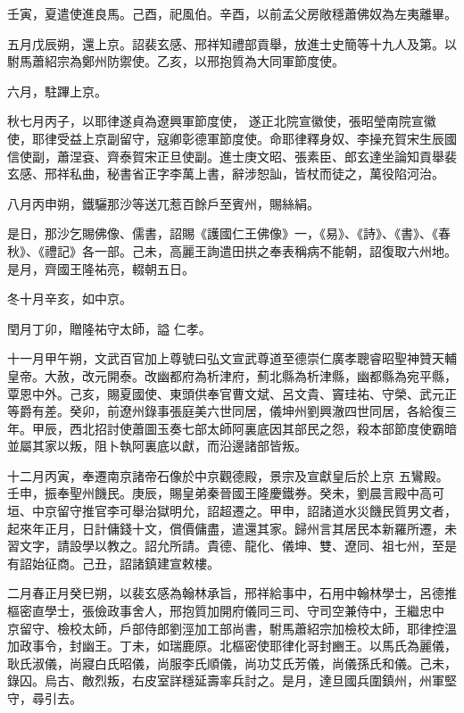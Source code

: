 \begin{pinyinscope}
 壬寅，夏遣使進良馬。己酉，祀風伯。辛酉，以前孟父房敞穩蕭佛奴為左夷離畢。



 五月戊辰朔，還上京。詔裴玄感、邢祥知禮部貢舉，放進士史簡等十九人及第。以駙馬蕭紹宗為鄭州防禦使。乙亥，以邢抱質為大同軍節度使。



 六月，駐蹕上京。



 秋七月丙子，以耶律遂貞為遼興軍節度使，
 遂正北院宣徽使，張昭瑩南院宣徽使，耶律受益上京副留守，寇卿彰德軍節度使。命耶律釋身奴、李操充賀宋生辰國信使副，蕭涅袞、齊泰賀宋正旦使副。進士庚文昭、張素臣、郎玄達坐論知貢舉裴玄感、邢祥私曲，秘書省正字李萬上書，辭涉恕訕，皆杖而徒之，萬役陷河治。



 八月丙申朔，鐵驪那沙等送兀惹百餘戶至賓州，賜絲絹。



 是日，那沙乞賜佛像、儒書，詔賜《護國仁王佛像》一，《易》、《詩》、《書》、《春秋》、《禮記》各一部。己未，高麗王詢遣田拱之奉表稱病不能朝，詔復取六州地。是月，齊國王隆祐亮，輟朝五日。



 冬十月辛亥，如中京。



 閏月丁卯，贈隆祐守太師，謚
 仁孝。



 十一月甲午朔，文武百官加上尊號曰弘文宣武尊道至德崇仁廣孝聰睿昭聖神贊天輔皇帝。大赦，改元開泰。改幽都府為析津府，薊北縣為析津縣，幽都縣為宛平縣，覃恩中外。己亥，賜夏國使、東頭供奉官曹文斌、呂文貴、竇珪祐、守榮、武元正等爵有差。癸卯，前遼州錄事張庭美六世同居，儀坤州劉興澈四世同居，各給復三年。甲辰，西北招討使蕭圖玉奏七部太師阿裏底因其部民之怨，殺本部節度使霸暗並屬其家以叛，阻卜執阿裏底以獻，而沿邊諸部皆叛。



 十二月丙寅，奉遷南京諸帝石像於中京觀德殿，景宗及宣獻皇后於上京
 五鸞殿。壬申，振奉聖州饑民。庚辰，賜皇弟秦晉國王隆慶鐵券。癸未，劉晨言殿中高可垣、中京留守推官李可舉治獄明允，詔超遷之。甲申，詔諸道水災饑民質男文者，起來年正月，日計傭錢十文，償價傭盡，遣還其家。歸州言其居民本新羅所遷，未習文字，請設學以教之。詔允所請。貴德、龍化、儀坤、雙、遼同、祖七州，至是有詔始征商。己丑，詔諸鎮建宣敕樓。



 二月春正月癸巳朔，以裴玄感為翰林承旨，邢祥給事中，石用中翰林學士，呂德推樞密直學士，張儉政事舍人，邢抱質加開府儀同三司、守司空兼侍中，王繼忠中
 京留守、檢校太師，戶部侍郎劉涇加工部尚書，駙馬蕭紹宗加檢校太師，耶律控溫加政事令，封幽王。丁未，如瑞鹿原。北樞密使耶律化哥封豳王。以馬氏為麗儀，耿氏淑儀，尚寢白氏昭儀，尚服李氏順儀，尚功艾氏芳儀，尚儀孫氏和儀。己未，錄囚。烏古、敵烈叛，右皮室詳穩延壽率兵討之。是月，達旦國兵圍鎮州，州軍堅守，尋引去。




\end{pinyinscope}
